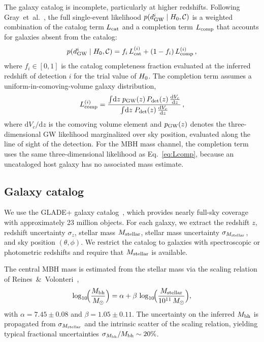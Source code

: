 The galaxy catalog is incomplete, particularly at higher redshifts.
Following Gray~et~al.~\cite{Gray:2019ksv}, the full single-event likelihood
$p(d_\mathrm{GW}^i \mid H_0, \mathcal{C})$ is a weighted combination of the
catalog term $L_\mathrm{cat}$ and a completion term $L_\mathrm{comp}$ that accounts for
galaxies absent from the catalog:
\begin{equation}
  p(d_\mathrm{GW}^i \mid H_0, \mathcal{C})
  = f_i\,L_\mathrm{cat}^{(i)} + (1 - f_i)\,L_\mathrm{comp}^{(i)} \,,
  \label{eq:completeness_combination}
\end{equation}
where $f_i \in [0,1]$ is the catalog completeness fraction evaluated at the
inferred redshift of detection $i$ for the trial value of $H_0$.
The completion term assumes a uniform-in-comoving-volume galaxy
distribution,
\begin{equation}
  \Lcomp^{(i)} = \frac{%
    \int \!\mathrm{d}z\;\pGW(z)\,\pdet(z)\,
    \frac{\mathrm{d}V_c}{\mathrm{d}z}
  }{%
    \int \!\mathrm{d}z\;\pdet(z)\,
    \frac{\mathrm{d}V_c}{\mathrm{d}z}
  } \,,
  \label{eq:Lcomp}
\end{equation}
where $\mathrm{d}V_c/\mathrm{d}z$ is the comoving volume element
and $p_\mathrm{GW}(z)$ denotes the three-dimensional GW likelihood marginalized
over sky position, evaluated along the line of sight of the detection.
For the MBH mass channel, the completion term uses the same
three-dimensional likelihood as Eq.~\eqref{eq:Lcomp}, because an
uncataloged host galaxy has no associated mass estimate.

\subsection{Galaxy catalog}
\label{sec:catalog}

We use the GLADE+ galaxy catalog~\cite{Dalya:2021ewn}, which provides
nearly full-sky coverage with approximately 23 million objects.
For each galaxy, we extract the redshift $z$, redshift uncertainty
$\sigma_z$, stellar mass $M_\mathrm{stellar}$, stellar mass uncertainty
$\sigma_{M_\mathrm{stellar}}$, and sky position $(\theta, \phi)$.
We restrict the catalog to galaxies with spectroscopic or
photometric redshifts and require that $M_\mathrm{stellar}$ is available.

The central MBH mass is estimated from the stellar mass via the
scaling relation of Reines~\&~Volonteri~\cite{Reines:2015moa},
\begin{equation}
  \log_{10}\!\Bigl(\frac{M_\mathrm{bh}}{M_\odot}\Bigr)
  = \alpha + \beta\,\log_{10}\!\Bigl(\frac{M_\mathrm{stellar}}{10^{11}\,M_\odot}\Bigr) ,
  \label{eq:scaling_relation}
\end{equation}
with $\alpha = 7.45 \pm 0.08$ and $\beta = 1.05 \pm 0.11$.
The uncertainty on the inferred $M_\mathrm{bh}$ is propagated from
$\sigma_{M_\mathrm{stellar}}$ and the intrinsic scatter of the scaling relation,
yielding typical fractional uncertainties
$\sigma_{M_\mathrm{bh}}/M_\mathrm{bh} \sim 20\%$.

